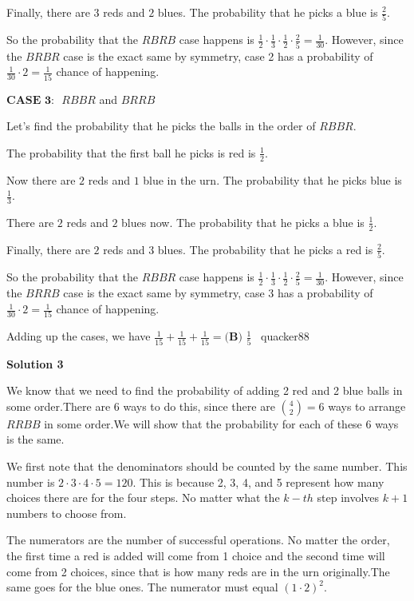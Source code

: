 \begin{enumerate}
 Finally, there are $3$ reds and $2$ blues. The probability that he picks a blue is $\frac{2}{5}$.

 So the probability that the $RBRB$ case happens is $\frac{1}{2} \cdot \frac{1}{3} \cdot \frac{1}{2} \cdot \frac{2}{5} = \frac{1}{30}$. However, since the $BRBR$ case is the exact same by symmetry, case 2 has a probability of $\frac{1}{30} \cdot 2 = \frac{1}{15}$ chance of happening.

 
$\textbf{CASE 3: }$ $RBBR$ and $BRRB$

 Let's find the probability that he picks the balls in the order of $RBBR$. 

 The probability that the first ball he picks is red is $\frac{1}{2}$. 

 Now there are $2$ reds and $1$ blue in the urn. The probability that he picks blue is $\frac{1}{3}$.

 There are $2$ reds and $2$ blues now. The probability that he picks a blue is $\frac{1}{2}$. 

 Finally, there are $2$ reds and $3$ blues. The probability that he picks a red is $\frac{2}{5}$.

 So the probability that the $RBBR$ case happens is $\frac{1}{2} \cdot \frac{1}{3} \cdot \frac{1}{2} \cdot \frac{2}{5} = \frac{1}{30}$. However, since the $BRRB$ case is the exact same by symmetry, case 3 has a probability of $\frac{1}{30} \cdot 2 = \frac{1}{15}$ chance of happening.

 Adding up the cases, we have $\frac{1}{15}+\frac{1}{15}+\frac{1}{15}=\boxed{\textbf{(B) }\frac15}$ ~quacker88

 



\textbf{Solution 3}

We know that we need to find the probability of adding 2 red and 2 blue balls in some order.There are 6 ways to do this, since there are $\binom{4}{2}=6$ ways to arrange $RRBB$ in some order.We will show that the probability for each of these 6 ways is the same.

 We first note that the denominators should be counted by the same number. This number is $2 \cdot 3 \cdot 4 \cdot 5=120$. This is because 2, 3, 4, and 5 represent how many choices there are for the four steps. No matter what the $k-th$ step involves $k+1$ numbers to choose from.

 The numerators are the number of successful operations. No matter the order, the first time a red is added will come from 1 choice and the second time will come from 2 choices, since that is how many reds are in the urn originally.The same goes for the blue ones. The numerator must equal $(1 \cdot 2)^2$.


\end{enumerate}
